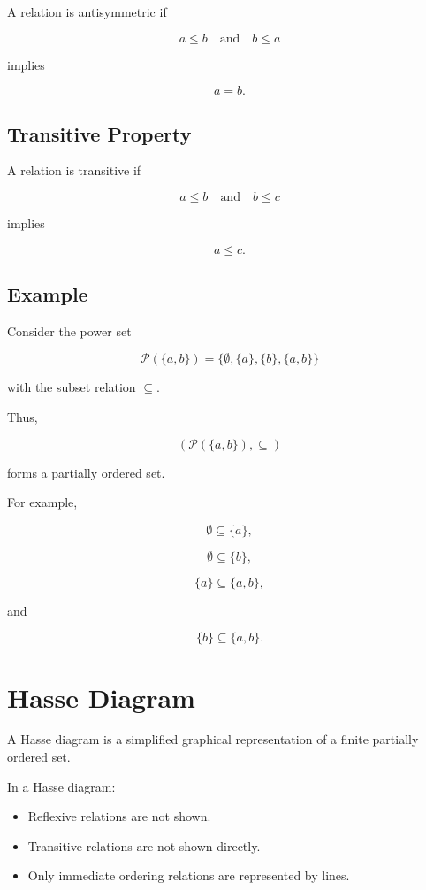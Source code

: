 \documentclass[12pt,a4paper]{article}
\begin{document}
A relation is antisymmetric if

\[
a\leq b
\quad\text{and}\quad
b\leq a
\]

implies

\[
a=b.
\]


\subsection{Transitive Property}

A relation is transitive if

\[
a\leq b
\quad\text{and}\quad
b\leq c
\]

implies

\[
a\leq c.
\]


\subsection{Example}

Consider the power set

\[
\mathcal{P}(\{a,b\})
=
\{\emptyset,\{a\},\{b\},\{a,b\}\}
\]

with the subset relation $\subseteq$.

Thus,

\[
(\mathcal{P}(\{a,b\}),\subseteq)
\]

forms a partially ordered set.

For example,

\[
\emptyset\subseteq\{a\},
\]

\[
\emptyset\subseteq\{b\},
\]

\[
\{a\}\subseteq\{a,b\},
\]

and

\[
\{b\}\subseteq\{a,b\}.
\]


\section{Hasse Diagram}

A Hasse diagram is a simplified graphical representation of a finite
partially ordered set.

In a Hasse diagram:

\begin{itemize}
    \item Reflexive relations are not shown.
    \item Transitive relations are not shown directly.
    \item Only immediate ordering relations are represented by lines.
\end{itemize}
\end{document}

